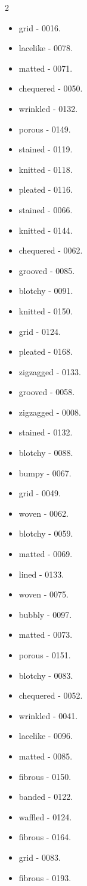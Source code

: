 \begin{multicols}{2}
\begin{itemize}
\item grid - 0016.
\item lacelike - 0078.
\item matted - 0071.
\item chequered - 0050.
\item wrinkled - 0132.
\item porous - 0149.
\item stained - 0119.
\item knitted - 0118.
\item pleated - 0116.
\item stained - 0066.
\item knitted - 0144.
\item chequered - 0062.
\item grooved - 0085.
\item blotchy - 0091.
\item knitted - 0150.
\item grid - 0124.
\item pleated - 0168.
\item zigzagged - 0133.
\item grooved - 0058.
\item zigzagged - 0008.
\item stained - 0132.
\item blotchy - 0088.
\item bumpy - 0067.
\item grid - 0049.
\item woven - 0062.
\item blotchy - 0059.
\item matted - 0069.
\item lined - 0133.
\item woven - 0075.
\item bubbly - 0097.
\item matted - 0073.
\item porous - 0151.
\item blotchy - 0083.
\item chequered - 0052.
\item wrinkled - 0041.
\item lacelike - 0096.
\item matted - 0085.
\item fibrous - 0150.
\item banded - 0122.
\item waffled - 0124.
\item fibrous - 0164.
\item grid - 0083.
\item fibrous - 0193.

\end{itemize}
\end{multicols}
